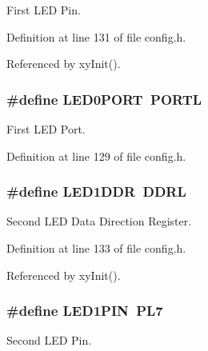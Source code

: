First L\-E\-D Pin. 



Definition at line 131 of file config.\-h.



Referenced by xy\-Init().

\hypertarget{group__config_gac0f99671c3447a31e5d3755e1f11ee1f}{
\subsubsection[{L\-E\-D0\-P\-O\-R\-T}]{\setlength{\rightskip}{0pt plus 5cm}\#define L\-E\-D0\-P\-O\-R\-T~P\-O\-R\-T\-L}}\label{group__config_gac0f99671c3447a31e5d3755e1f11ee1f}


First L\-E\-D Port. 



Definition at line 129 of file config.\-h.

\hypertarget{group__config_gab0f33b52cdb68e643eba6cf583fb625f}{
\subsubsection[{L\-E\-D1\-D\-D\-R}]{\setlength{\rightskip}{0pt plus 5cm}\#define L\-E\-D1\-D\-D\-R~D\-D\-R\-L}}\label{group__config_gab0f33b52cdb68e643eba6cf583fb625f}


Second L\-E\-D Data Direction Register. 



Definition at line 133 of file config.\-h.



Referenced by xy\-Init().

\hypertarget{group__config_ga04d7aaffbb7b5afaf49acf8a3a39e33a}{
\subsubsection[{L\-E\-D1\-P\-I\-N}]{\setlength{\rightskip}{0pt plus 5cm}\#define L\-E\-D1\-P\-I\-N~P\-L7}}\label{group__config_ga04d7aaffbb7b5afaf49acf8a3a39e33a}


Second L\-E\-D Pin. 



